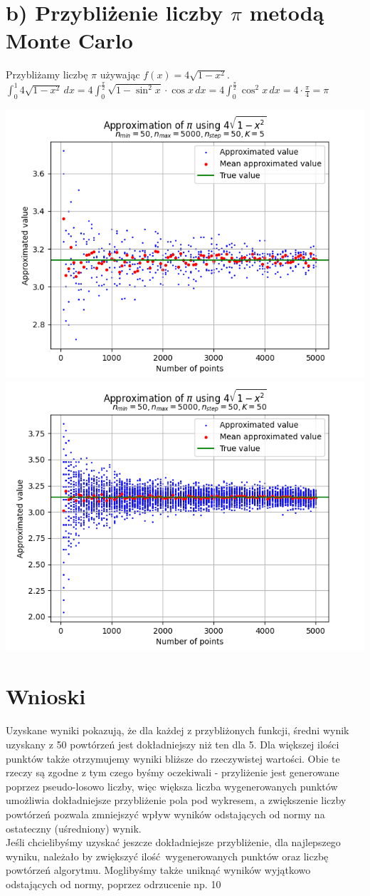 \documentclass[12pt, a4paper]{article}
\begin{document}
\section*{b) Przybliżenie liczby $\pi$ metodą Monte Carlo}

Przybliżamy liczbę $\pi$ używając $f(x) = 4\sqrt{1-x^2}$. \\
$\int_0^1 4\sqrt{1-x^2} \,dx = 4 \int_0^{\frac{\pi}{2}} \sqrt{1 - \sin^2x} \cdot \cos x \,dx = 4 \int_0^{\frac{\pi}{2}} \cos^2x \,dx = 4 \cdot \frac{\pi}{4} = \pi$

\includegraphics[width=0.48\linewidth]{fpik1.png}
\includegraphics[width=0.48\linewidth]{fpik2.png}

\section*{Wnioski}

Uzyskane wyniki pokazują, że dla każdej z przybliżonych funkcji, średni wynik uzyskany z 50 powtórzeń jest dokładniejszy niż ten dla 5. Dla większej ilości punktów także otrzymujemy wyniki bliższe do rzeczywistej wartości. Obie te rzeczy są zgodne z tym czego byśmy oczekiwali - przyliżenie jest generowane poprzez pseudo-losowo liczby, więc większa liczba wygenerowanych punktów umożliwia dokładniejsze przybliżenie pola pod wykresem, a zwiększenie liczby powtórzeń pozwala zmniejszyć wpływ wyników odstających od normy na ostateczny (uśredniony) wynik. \\
Jeśli chcielibyśmy uzyskać jeszcze dokładniejsze przybliżenie, dla najlepszego wyniku, należało by zwiększyć ilość wygenerowanych punktów oraz liczbę powtórzeń algorytmu. Moglibyśmy także uniknąć wyników wyjątkowo odstających od normy, poprzez odrzucenie np. 10%
\end{document}
